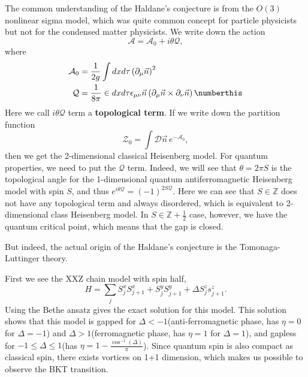 The common understanding of the Haldane's conjecture is from the  $O(3)$ nonlinear sigma model, which was quite common concept for particle physicists but not for the condensed matter physicists. We write down the action
\begin{equation}
\mathcal{A}=\mathcal{A}_0+i\theta\mathcal{Q},
\end{equation}
where
\begin{align*}
\mathcal{A}_0&=\frac{1}{2g}\int dxd\tau\left(\partial_\mu\vec{n}\right)^2\\
\mathcal{Q}&=\frac{1}{8\pi}\in dxd\tau \epsilon_{\mu\nu}\vec{n}\left(\partial_\mu\vec{n}\times \partial_\nu\vec{n}\right)\numberthis
\end{align*}
Here we call $i\theta \mathcal{Q}$ term a \textbf{topological term}. If we write down the partition function
\begin{equation}
\mathcal{Z}_0=\int\mathcal{D}\vec{n}\, e^{-\mathcal{A}_0},
\end{equation}
then we get the 2-dimensional classical Heisenberg model. For quantum properties, we need to put the $\mathcal{Q}$ term. Indeed, we will see that $\theta=2\pi S$ is the topological angle for the 1-dimensional quantum antiferromagnetic Heisenberg model with spin $S$, and thus $e^{i\theta \mathcal{Q}}=(-1)^{2S\mathcal{Q}}$. Here we can see that $S\in\mathbb{Z}$ does not have any topological term and always disordered, which is equivalent to 2-dimensional class Heisenberg model. In $S\in\mathbb{Z}+\frac{1}{2}$ case, however, we have the quantum critical point, which means that the gap is closed.

But indeed, the actual origin of the Haldane's conjecture is the Tomonaga-Luttinger theory.

First we see the XXZ chain model with spin half,
\begin{equation}
H=\sum_{j}S_j^x S_{j+1}^x + S_j^y S_{j+1}^y +\Delta S_j^z s_{j+1}^z.
\end{equation}
Using the Bethe ansatz gives the exact solution for this model. This solution shows that this model is gapped for $\Delta<-1$(anti-ferromagnetic phase, has $\eta=0$ for $\Delta=-1$) and $\Delta>1$(ferromagnetic phase, has $\eta=1$ for $\Delta=1$), and gapless for $-1\leq \Delta\leq 1$(has $\eta=1-\frac{\cos^{-1}(\Delta)}{\pi}$). Since quantum spin is also compact as classical spin, there exists vortices on 1+1 dimension, which makes us possible to observe the BKT transition.

